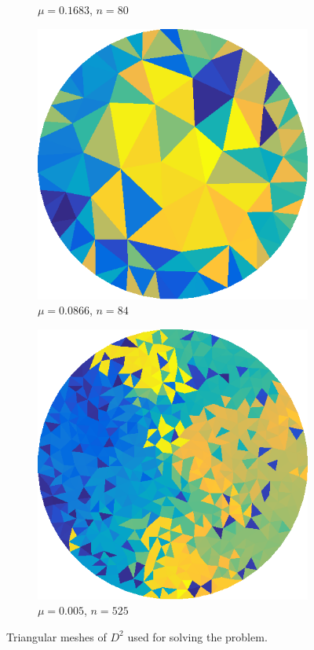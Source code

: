 \documentclass[../fem.tex]{subfile}
\begin{document}
\begin{figure}[htpb]
\begin{subfigure}{0.4\textwidth}
    \caption{$\mu=0.1683$, $n=80$}
  \end{subfigure}
  \begin{subfigure}{0.4\textwidth}
    \centering
    \includegraphics[width=0.8\linewidth]{figures/c3/tri.png}
    \caption{$\mu=0.0866$, $n=84$}
  \end{subfigure}
  \begin{subfigure}{0.4\textwidth}
    \centering
    \includegraphics[width=0.8\linewidth]{figures/c4/tri.png}
    \caption{$\mu=0.005$, $n=525$}
  \end{subfigure}
  \caption{Triangular meshes of $D^2$ used for solving the problem.}
  \label{fig:d2_mesh}
\end{figure}
\end{document}
